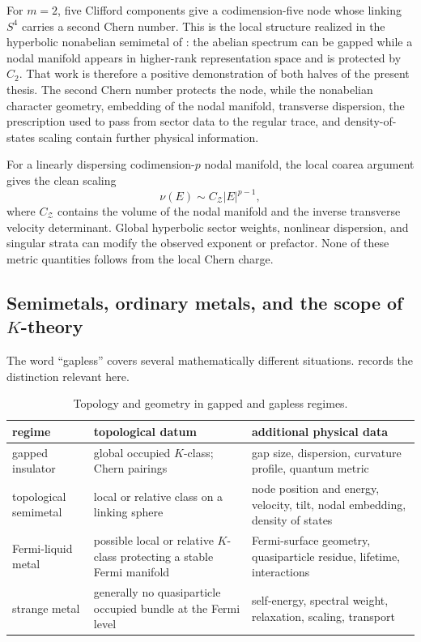 \documentclass[11pt]{article}
\theoremstyle{definition}
\theoremstyle{remark}
\begin{document}
For \(m=2\), five Clifford components give a codimension-five node whose
linking \(S^4\) carries a second Chern number.  This is the local structure
realized in the hyperbolic nonabelian semimetal of
\cite{TummuruEtAl2024}: the abelian spectrum can be gapped while a nodal
manifold appears in higher-rank representation space and is protected by
\(C_2\).  That work is therefore a positive demonstration of both halves of
the present thesis.  The second Chern number protects the node, while the
nonabelian character geometry, embedding of the nodal manifold, transverse
dispersion, the prescription used to pass from sector data to the regular
trace, and density-of-states scaling contain further physical information.

For a linearly dispersing codimension-\(p\) nodal manifold, the local
coarea argument gives the clean scaling
\[
                         \nu(E)\sim C_{\mathcal Z}|E|^{p-1},
                         \tag{8.12}\label{eq:nodal-dos-scaling}
\]
where \(C_{\mathcal Z}\) contains the volume of the nodal manifold and the
inverse transverse velocity determinant.  Global hyperbolic sector weights,
nonlinear dispersion, and singular strata can modify the observed exponent
or prefactor.  None of these metric quantities follows from the local Chern
charge.

\subsection{Semimetals, ordinary metals, and the scope of
  \texorpdfstring{\(K\)}{K}-theory}

The word ``gapless'' covers several mathematically different situations.
 records the distinction relevant here.

\begin{table}[ht]
\centering
\small
\begin{tabular}{@{}
 >{\raggedright\arraybackslash}p{}
 >{\raggedright\arraybackslash}p{}
 >{\raggedright\arraybackslash}p{}@{}}
\toprule
\textbf{regime} & \textbf{topological datum} & \textbf{additional physical data}\\
\midrule
gapped insulator
 & global occupied \(K\)-class; Chern pairings
 & gap size, dispersion, curvature profile, quantum metric\\
topological semimetal
 & local or relative class on a linking sphere
 & node position and energy, velocity, tilt, nodal embedding, density of states\\
Fermi-liquid metal
 & possible local or relative \(K\)-class protecting a stable Fermi manifold
 & Fermi-surface geometry, quasiparticle residue, lifetime, interactions\\
strange metal
 & generally no quasiparticle occupied bundle at the Fermi level
 & self-energy, spectral weight, relaxation, scaling, transport\\
\bottomrule
\end{tabular}
\caption{Topology and geometry in gapped and gapless regimes.}
\label{tab:metal-regimes}
\end{table}
\end{document}
